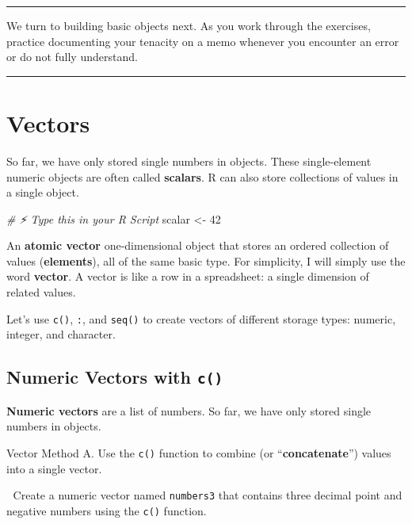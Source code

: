 \documentclass[
  12pt,
]{scrreprt}
\newenvironment{Shaded}{\begin{snugshade}}{\end{snugshade}}
\newcommand{\CommentTok}[1]{\textcolor[rgb]{0.56,0.35,0.01}{\textit{#1}}}
\newcommand{\DecValTok}[1]{\textcolor[rgb]{0.00,0.00,0.81}{#1}}
\newcommand{\NormalTok}[1]{#1}
\newcommand{\OtherTok}[1]{\textcolor[rgb]{0.56,0.35,0.01}{#1}}
\begin{document}
\begin{center}\rule{0.5\linewidth}{0.5pt}\end{center}

We turn to building basic objects next. As you work through the
exercises, practice documenting your tenacity on a memo whenever you
encounter an error or do not fully understand.

\begin{center}\rule{0.5\linewidth}{0.5pt}\end{center}

\chapter{Vectors}\label{vectors}

So far, we have only stored single numbers in objects. These
single-element numeric objects are often called \textbf{scalars}. R can
also store collections of values in a single object.

\begin{Shaded}
\begin{Highlighting}[]
\CommentTok{\# ⚡ Type this in your R Script}
\NormalTok{scalar }\OtherTok{\textless{}{-}} \DecValTok{42}
\end{Highlighting}
\end{Shaded}

An \textbf{atomic vector} one-dimensional object that stores an ordered
collection of values (\textbf{elements}), all of the same basic type.
For simplicity, I will simply use the word \textbf{vector}. A vector is
like a row in a spreadsheet: a single dimension of related values.

Let's use \texttt{c()}, \texttt{:}, and \texttt{seq()} to create vectors
of different storage types: numeric, integer, and character.

\section{\texorpdfstring{Numeric Vectors with
\texttt{c()}}{Numeric Vectors with c()}}\label{numeric-vectors-with-c}

\textbf{Numeric vectors} are a list of numbers. So far, we have only
stored single numbers in objects.

Vector Method A. Use the \texttt{c()} function to combine (or
``\textbf{concatenate}'') values into a single vector.

🎯 Create a numeric vector named \texttt{numbers3} that contains three
decimal point and negative numbers using the \texttt{c()} function.
\end{document}
